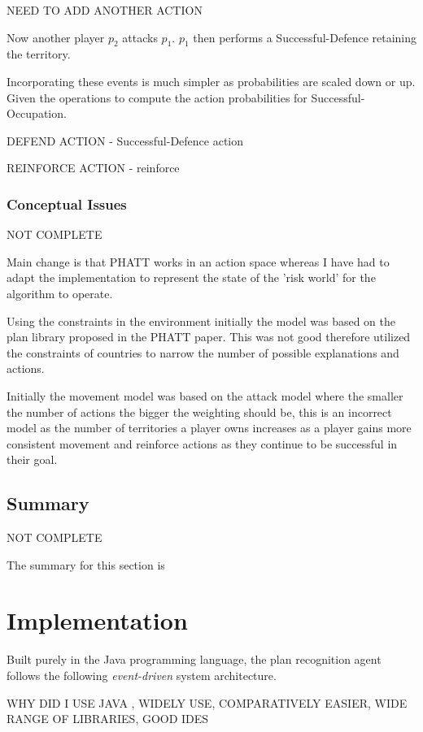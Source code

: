 \documentclass[parskip]{cs4rep}
\begin{document}
NEED TO ADD ANOTHER ACTION

Now another player $p_2$ attacks $p_1$.  $p_1$ then performs a Successful-Defence retaining the territory.

Incorporating these events is much simpler as probabilities are scaled down or up. Given the operations to compute the action probabilities for Successful-Occupation.

DEFEND ACTION - Successful-Defence action

REINFORCE ACTION - reinforce

\subsection{Conceptual Issues}

NOT COMPLETE

Main change is that PHATT works in an action space whereas I have had to adapt the implementation to represent the state of the 'risk world' for the algorithm to operate.

Using the constraints in the environment initially the model was based on the plan library proposed in the PHATT paper. This was not good therefore utilized the constraints of countries to narrow the number of possible explanations and actions.

Initially the movement model was based on the attack model where the smaller the number of actions the bigger the weighting should be, this is an incorrect model as the number of territories a player owns increases as a player gains more consistent movement and reinforce actions as they continue to be successful in their goal.

\section{Summary}

NOT COMPLETE

The summary for this section is

\chapter{Implementation}

Built purely in the Java programming language, the plan recognition agent follows the following \textit{event-driven} system architecture.

WHY DID I USE JAVA , WIDELY USE, COMPARATIVELY EASIER, WIDE RANGE OF LIBRARIES, GOOD IDES
\end{document}
